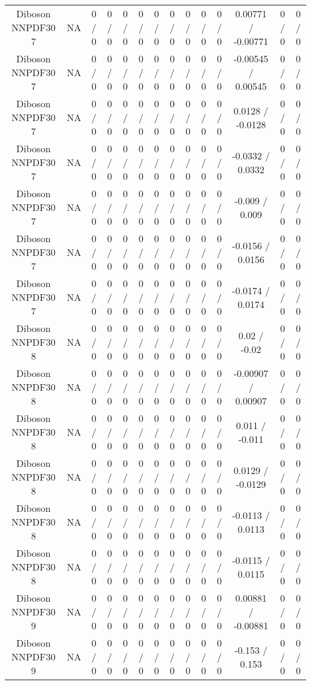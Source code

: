 \documentclass[10pt]{article}
\begin{document}
\begin{table}[htbp]
\begin{center}
\begin{tabular}{|c|c|c|c|c|c|c|c|c|c|c|c|c|c|}
  Diboson NNPDF30 7 &    NA    & 0 / 0 & 0 / 0 & 0 / 0 & 0 / 0 & 0 / 0 & 0 / 0 & 0 / 0 & 0 / 0 & 0 / 0 & 0.00771 / -0.00771 & 0 / 0 & 0 / 0 \\ 
  Diboson NNPDF30 7 &    NA    & 0 / 0 & 0 / 0 & 0 / 0 & 0 / 0 & 0 / 0 & 0 / 0 & 0 / 0 & 0 / 0 & 0 / 0 & -0.00545 / 0.00545 & 0 / 0 & 0 / 0 \\ 
  Diboson NNPDF30 7 &    NA    & 0 / 0 & 0 / 0 & 0 / 0 & 0 / 0 & 0 / 0 & 0 / 0 & 0 / 0 & 0 / 0 & 0 / 0 & 0.0128 / -0.0128 & 0 / 0 & 0 / 0 \\ 
  Diboson NNPDF30 7 &    NA    & 0 / 0 & 0 / 0 & 0 / 0 & 0 / 0 & 0 / 0 & 0 / 0 & 0 / 0 & 0 / 0 & 0 / 0 & -0.0332 / 0.0332 & 0 / 0 & 0 / 0 \\ 
  Diboson NNPDF30 7 &    NA    & 0 / 0 & 0 / 0 & 0 / 0 & 0 / 0 & 0 / 0 & 0 / 0 & 0 / 0 & 0 / 0 & 0 / 0 & -0.009 / 0.009 & 0 / 0 & 0 / 0 \\ 
  Diboson NNPDF30 7 &    NA    & 0 / 0 & 0 / 0 & 0 / 0 & 0 / 0 & 0 / 0 & 0 / 0 & 0 / 0 & 0 / 0 & 0 / 0 & -0.0156 / 0.0156 & 0 / 0 & 0 / 0 \\ 
  Diboson NNPDF30 7 &    NA    & 0 / 0 & 0 / 0 & 0 / 0 & 0 / 0 & 0 / 0 & 0 / 0 & 0 / 0 & 0 / 0 & 0 / 0 & -0.0174 / 0.0174 & 0 / 0 & 0 / 0 \\ 
  Diboson NNPDF30 8 &    NA    & 0 / 0 & 0 / 0 & 0 / 0 & 0 / 0 & 0 / 0 & 0 / 0 & 0 / 0 & 0 / 0 & 0 / 0 & 0.02 / -0.02 & 0 / 0 & 0 / 0 \\ 
  Diboson NNPDF30 8 &    NA    & 0 / 0 & 0 / 0 & 0 / 0 & 0 / 0 & 0 / 0 & 0 / 0 & 0 / 0 & 0 / 0 & 0 / 0 & -0.00907 / 0.00907 & 0 / 0 & 0 / 0 \\ 
  Diboson NNPDF30 8 &    NA    & 0 / 0 & 0 / 0 & 0 / 0 & 0 / 0 & 0 / 0 & 0 / 0 & 0 / 0 & 0 / 0 & 0 / 0 & 0.011 / -0.011 & 0 / 0 & 0 / 0 \\ 
  Diboson NNPDF30 8 &    NA    & 0 / 0 & 0 / 0 & 0 / 0 & 0 / 0 & 0 / 0 & 0 / 0 & 0 / 0 & 0 / 0 & 0 / 0 & 0.0129 / -0.0129 & 0 / 0 & 0 / 0 \\ 
  Diboson NNPDF30 8 &    NA    & 0 / 0 & 0 / 0 & 0 / 0 & 0 / 0 & 0 / 0 & 0 / 0 & 0 / 0 & 0 / 0 & 0 / 0 & -0.0113 / 0.0113 & 0 / 0 & 0 / 0 \\ 
  Diboson NNPDF30 8 &    NA    & 0 / 0 & 0 / 0 & 0 / 0 & 0 / 0 & 0 / 0 & 0 / 0 & 0 / 0 & 0 / 0 & 0 / 0 & -0.0115 / 0.0115 & 0 / 0 & 0 / 0 \\ 
  Diboson NNPDF30 9 &    NA    & 0 / 0 & 0 / 0 & 0 / 0 & 0 / 0 & 0 / 0 & 0 / 0 & 0 / 0 & 0 / 0 & 0 / 0 & 0.00881 / -0.00881 & 0 / 0 & 0 / 0 \\ 
  Diboson NNPDF30 9 &    NA    & 0 / 0 & 0 / 0 & 0 / 0 & 0 / 0 & 0 / 0 & 0 / 0 & 0 / 0 & 0 / 0 & 0 / 0 & -0.153 / 0.153 & 0 / 0 & 0 / 0 \\ 

\end{tabular}
\end{center}
\end{table}
\end{document}
